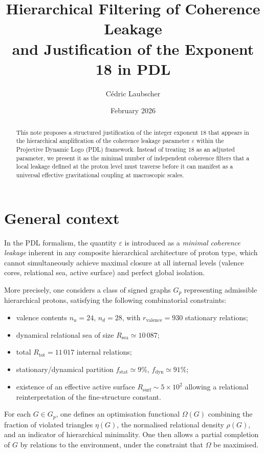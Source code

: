 \documentclass[11pt,a4paper]{article}
\title{Hierarchical Filtering of Coherence Leakage \\ and Justification of the Exponent 18 in PDL}
\author{Cédric Laubscher}
\date{February 2026}
\begin{document}
\maketitle

\begin{abstract}
This note proposes a structured justification of the integer exponent $18$
that appears in the hierarchical amplification of the coherence leakage
parameter $\varepsilon$ within the Projective Dynamic Logo (PDL) framework.
Instead of treating $18$ as an adjusted parameter, we present it as the minimal
number of independent coherence filters that a local leakage defined at the
proton level must traverse before it can manifest as a universal effective
gravitational coupling at macroscopic scales.
\end{abstract}

\section{General context}

In the PDL formalism, the quantity $\varepsilon$ is introduced as a
\emph{minimal coherence leakage} inherent in any composite hierarchical
architecture of proton type, which cannot simultaneously achieve maximal
closure at all internal levels (valence cores, relational sea, active surface)
and perfect global isolation.

More precisely, one considers a class of signed graphs $G_p$ representing
admissible hierarchical protons, satisfying the following combinatorial
constraints:
\begin{itemize}
  \item valence contents $n_u = 24$, $n_d = 28$, 
        with $r_{\text{valence}} = 930$ stationary relations;
  \item dynamical relational sea of size $R_{\text{sea}} \simeq 10\,087$;
  \item total $R_{\text{tot}} = 11\,017$ internal relations;
  \item stationary/dynamical partition $f_{\text{stat}} \simeq 9\%$, 
        $f_{\text{dyn}} \simeq 91\%$;
  \item existence of an effective active surface 
        $R_{\text{surf}} \sim 5 \times 10^2$ allowing a relational
        reinterpretation of the fine-structure constant.
\end{itemize}

For each $G \in G_p$, one defines an optimisation functional $\Omega(G)$
combining the fraction of violated triangles $\eta(G)$, the normalised
relational density $\rho(G)$, and an indicator of hierarchical minimality.
One then allows a partial completion of $G$ by relations to the environment,
under the constraint that $\Omega$ be maximised.
\end{document}
